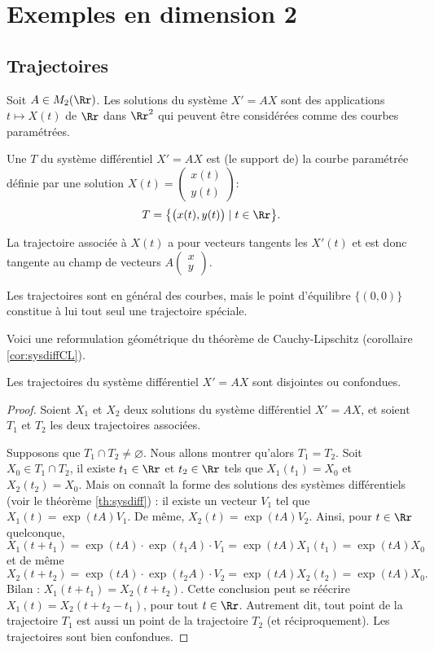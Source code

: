 \documentclass[12pt, class=report,crop=false]{standalone}
\begin{document}
\section{Exemples en dimension 2}


\subsection{Trajectoires}

Soit $A\in M_2(\Rr)$. Les solutions du système $X'=AX$ sont des applications 
$t \mapsto X(t)$ de $\Rr$ dans $\Rr^2$ qui peuvent être
considérées comme des courbes paramétrées. 

Une  $T$ du système différentiel $X'=AX$ est (le support de) la courbe paramétrée 
définie par une solution $X(t) = \left(\begin{smallmatrix}x(t)\\y(t)\end{smallmatrix} \right)$:
$$T =  \big\{ \big( x(t), y(t) \big) \mid t \in \Rr \big\}.$$

La  trajectoire associée à $X(t)$ a pour vecteurs tangents les $X'(t)$ et est  donc tangente
au champ de vecteurs $A \left(\begin{smallmatrix}x\\y\end{smallmatrix} \right)$.

Les trajectoires sont en général des courbes, mais le point d'équilibre $\{(0,0)\}$ constitue à lui tout seul une trajectoire spéciale.

\bigskip

Voici une reformulation géométrique du théorème de Cauchy-Lipschitz (corollaire \ref{cor:sysdiffCL}).
\begin{proposition}
Les trajectoires du système différentiel $X'=AX$ sont disjointes ou confondues. 
\end{proposition} 

\begin{proof}
Soient $X_1$ et $X_2$ deux solutions du système différentiel $X'=AX$, et 
soient $T_1$ et $T_2$ les deux trajectoires associées.

Supposons que $T_1 \cap T_2 \neq \varnothing$. Nous allons montrer qu'alors $T_1=T_2$.
Soit $X_0 \in T_1 \cap T_2$, 
il existe $t_1\in\Rr$ et $t_2\in\Rr$ tels que 
$X_1(t_1)=X_0$ et $X_2(t_2)=X_0.$
Mais on connaît la forme des solutions des systèmes différentiels (voir le théorème \ref{th:sysdiff}) :
il existe un vecteur $V_1$ tel que $X_1(t)  = \exp(tA)V_1$.
De même, $X_2(t) = \exp(tA)V_2$.
Ainsi, pour $t \in \Rr$ quelconque,
$$X_1(t+t_1) = \exp(tA) \cdot \exp(t_1A) \cdot V_1 = \exp(tA) X_1(t_1) = \exp(tA) X_0$$
et de même
$$X_2(t+t_2) = \exp(tA) \cdot \exp(t_2A) \cdot V_2 = \exp(tA) X_2(t_2) = \exp(tA) X_0.$$
Bilan : $X_1(t+t_1)=X_2(t+t_2)$. Cette conclusion peut se réécrire 
$X_1(t)=X_2(t+t_2-t_1)$, pour tout $t\in \Rr$. Autrement dit, tout point de la trajectoire $T_1$ est aussi un point de la trajectoire $T_2$ (et réciproquement). Les trajectoires sont bien confondues.
\end{proof}
\end{document}
